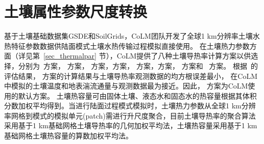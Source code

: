\chapter{土壤属性参数尺度转换}\label{土壤尺度转换}

基于土壤基础数据集GSDE和SoilGrids，CoLM团队开发了全球1 km分辨率土壤水热特征参数数据供陆面模式土壤水热传输过程模拟直接使用。
在土壤热力参数方面（详见第~\ref{sec_thermalpar} 节），CoLM提供了八种土壤导热率计算方案以供选择，分别为~\citet{farouki1981thermal}方案，\citet{Johansen1975} 方案，
\citet{cote2005} 方案，\citet{balland2005}方案，\citet{lu2007improved} 方案，\citet{Yan2019thermal}方案，\citet{tarnawski2012series} 方案和~\citet{de1963thermal} 方案。
根据~\citet{dai2019evaluation}的评估结果，\citet{balland2005} 方案的计算结果与土壤导热率观测数据的均方根误差最小，
在CoLM中模拟的土壤温度和地表湍流通量与观测数据最为接近。因此，\citet{balland2005} 方案为CoLM使用的默认方案。
土壤热容量可由固体土壤、液态水和固态水的热容量根据其体积分数加权平均得到。当进行陆面过程模式模拟时，土壤热力参数从全球1 km分辨率网格到模式的模拟单元(patch)需进行升尺度聚合，目前土壤导热率的聚合算法采用基于1 km基础网格土壤导热率的几何加权平均法，土壤热容量采用基于1 km基础网格土壤热容量的算数加权平均法。


